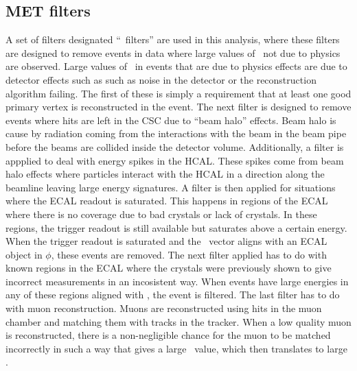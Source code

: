 \subsection{MET filters}
\label{ssec:metfilter}
A set of filters designated ``\MET\ filters'' are used in this analysis,
where these filters are designed to remove events in data where large values of \MET\ not due to physics are observed.
Large values of \MET\ in events that are due to physics effects are due to detector effects such as such as noise in the detector or the reconstruction algorithm failing.
The first of these is simply a requirement that at least one good primary vertex is reconstructed in the event.
The next filter is designed to remove events where hits are left in the CSC due to ``beam halo'' effects.
Beam halo is cause by radiation coming from the interactions with the beam in the beam pipe before the beams are collided inside the detector volume.
Additionally, a filter is appplied to deal with energy spikes in the HCAL.
These spikes come from beam halo effects where particles interact with the HCAL in a direction along the beamline leaving large energy signatures.
A filter is then applied for situations where the ECAL readout is saturated.
This happens in regions of the ECAL where there is no coverage due to bad crystals or lack of crystals.
In these regions, the trigger readout is still available but saturates above a certain energy.
When the trigger readout is saturated and the \MET\ vector aligns with an ECAL object in $\phi$, these events are removed.
The next filter applied has to do with known regions in the ECAL where the crystals were previously shown to give incorrect measurements in an incosistent way.
When events have large energies in any of these regions aligned with \MET, the event is filtered.
The last filter has to do with muon reconstruction.
Muons are reconstructed using hits in the muon chamber and matching them with tracks in the tracker.
When a low quality muon is reconstructed,
there is a non-negligible chance for the muon to be matched incorrectly in such a way that gives a large \pt\ value,
which then translates to large \MET.

